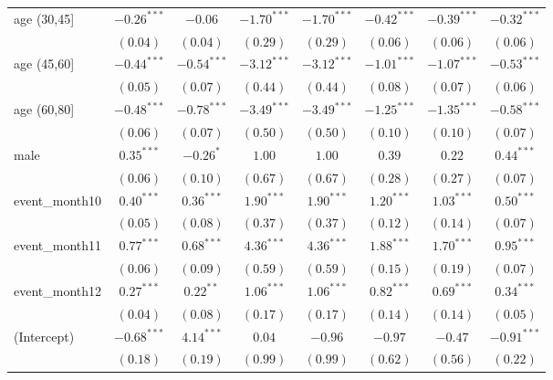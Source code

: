 \begin{table}
\begin{center}
\begin{tabular}{l c c c c c c c}
age (30,45]    & $-0.26^{***}$ & $-0.06$       & $-1.70^{***}$ & $-1.70^{***}$ & $-0.42^{***}$ & $-0.39^{***}$ & $-0.32^{***}$ \\
               & $(0.04)$      & $(0.04)$      & $(0.29)$      & $(0.29)$      & $(0.06)$      & $(0.06)$      & $(0.06)$      \\
age (45,60]    & $-0.44^{***}$ & $-0.54^{***}$ & $-3.12^{***}$ & $-3.12^{***}$ & $-1.01^{***}$ & $-1.07^{***}$ & $-0.53^{***}$ \\
               & $(0.05)$      & $(0.07)$      & $(0.44)$      & $(0.44)$      & $(0.08)$      & $(0.07)$      & $(0.06)$      \\
age (60,80]    & $-0.48^{***}$ & $-0.78^{***}$ & $-3.49^{***}$ & $-3.49^{***}$ & $-1.25^{***}$ & $-1.35^{***}$ & $-0.58^{***}$ \\
               & $(0.06)$      & $(0.07)$      & $(0.50)$      & $(0.50)$      & $(0.10)$      & $(0.10)$      & $(0.07)$      \\
male           & $0.35^{***}$  & $-0.26^{*}$   & $1.00$        & $1.00$        & $0.39$        & $0.22$        & $0.44^{***}$  \\
               & $(0.06)$      & $(0.10)$      & $(0.67)$      & $(0.67)$      & $(0.28)$      & $(0.27)$      & $(0.07)$      \\
event\_month10 & $0.40^{***}$  & $0.36^{***}$  & $1.90^{***}$  & $1.90^{***}$  & $1.20^{***}$  & $1.03^{***}$  & $0.50^{***}$  \\
               & $(0.05)$      & $(0.08)$      & $(0.37)$      & $(0.37)$      & $(0.12)$      & $(0.14)$      & $(0.07)$      \\
event\_month11 & $0.77^{***}$  & $0.68^{***}$  & $4.36^{***}$  & $4.36^{***}$  & $1.88^{***}$  & $1.70^{***}$  & $0.95^{***}$  \\
               & $(0.06)$      & $(0.09)$      & $(0.59)$      & $(0.59)$      & $(0.15)$      & $(0.19)$      & $(0.07)$      \\
event\_month12 & $0.27^{***}$  & $0.22^{**}$   & $1.06^{***}$  & $1.06^{***}$  & $0.82^{***}$  & $0.69^{***}$  & $0.34^{***}$  \\
               & $(0.04)$      & $(0.08)$      & $(0.17)$      & $(0.17)$      & $(0.14)$      & $(0.14)$      & $(0.05)$      \\
(Intercept)    & $-0.68^{***}$ & $4.14^{***}$  & $0.04$        & $-0.96$       & $-0.97$       & $-0.47$       & $-0.91^{***}$ \\
               & $(0.18)$      & $(0.19)$      & $(0.99)$      & $(0.99)$      & $(0.62)$      & $(0.56)$      & $(0.22)$      \\

\end{tabular}
\end{center}
\end{table}
